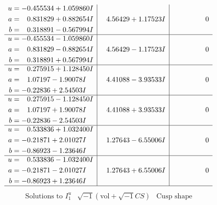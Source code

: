 \documentclass[1p]{elsarticle_modified}
\theoremstyle{definition}
\newcommand{\I}{\sqrt{-1}}
\begin{document}
$$\begin{array}{c|c|c}
\begin{aligned}
u &= -0.455534 + 1.059860 I \\
a &= \phantom{-}0.831829 + 0.882654 I \\
b &= \phantom{-}0.318891 - 0.567994 I\end{aligned}
 & \phantom{-}4.56429 + 1.17523 I & \phantom{-0.000000 } 0 \\ \hline\begin{aligned}
u &= -0.455534 - 1.059860 I \\
a &= \phantom{-}0.831829 - 0.882654 I \\
b &= \phantom{-}0.318891 + 0.567994 I\end{aligned}
 & \phantom{-}4.56429 - 1.17523 I & \phantom{-0.000000 } 0 \\ \hline\begin{aligned}
u &= \phantom{-}0.275915 + 1.128450 I \\
a &= \phantom{-}1.07197 - 1.90078 I \\
b &= -0.22836 + 2.54503 I\end{aligned}
 & \phantom{-}4.41088 - 3.93533 I & \phantom{-0.000000 } 0 \\ \hline\begin{aligned}
u &= \phantom{-}0.275915 - 1.128450 I \\
a &= \phantom{-}1.07197 + 1.90078 I \\
b &= -0.22836 - 2.54503 I\end{aligned}
 & \phantom{-}4.41088 + 3.93533 I & \phantom{-0.000000 } 0 \\ \hline\begin{aligned}
u &= \phantom{-}0.533836 + 1.032400 I \\
a &= -0.21871 + 2.01027 I \\
b &= -0.86923 - 1.23646 I\end{aligned}
 & \phantom{-}1.27643 - 6.55006 I & \phantom{-0.000000 } 0 \\ \hline\begin{aligned}
u &= \phantom{-}0.533836 - 1.032400 I \\
a &= -0.21871 - 2.01027 I \\
b &= -0.86923 + 1.23646 I\end{aligned}
 & \phantom{-}1.27643 + 6.55006 I & \phantom{-0.000000 } 0\\
 \hline 
 \end{array}$$\newpage$$\begin{array}{c|c|c}  
\text{Solutions to }I^u_{1}& \I (\text{vol} + \sqrt{-1}CS) & \text{Cusp shape}\\

\end{array}$$
\end{document}

